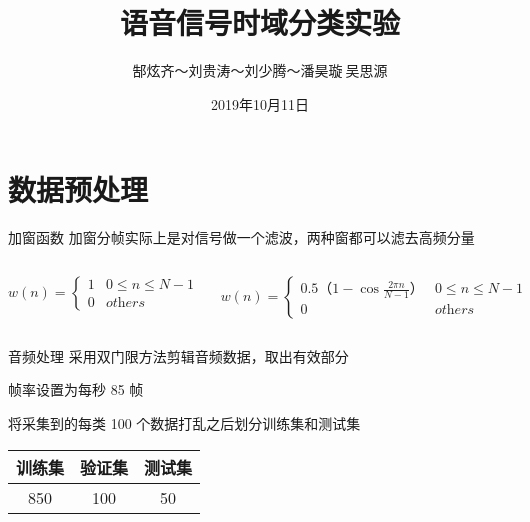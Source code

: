 \documentclass[aspectratio=169, 13pt,compress]{beamer}
\title{语音信号时域分类实验}
\author{郜炫齐$～$刘贵涛$～$刘少腾$～$潘昊璇$~$吴思源}
\date{2019年10月11日}
\begin{document}
\maketitle
\frame{
\centering
\tableofcontents[hideallsubsections]
}

\section{数据预处理}
\frame{\sectionpage}

\begin{frame}{加窗函数}
加窗分帧实际上是对信号做一个滤波，两种窗都可以滤去高频分量
\vspace{1cm}
 \begin{columns}
 
    $$ w(n) = \left \{ \begin{array}{cc}
        1 & 0 \leq n \leq N - 1 \\
        0 & \textit{others} 
    \end{array} \right.$$ 


$$ w(n) = \left \{ \begin{array}{cc}
     0.5（1- \cos{\frac{2 \pi n}{N -1 }}） & 0 \leq n \leq N -1  \\
     0 & \textit{others}
\end{array}
\right. $$
 \end{columns}
 
\end{frame}{}
\begin{frame}[center]{音频处理}
\centering
    采用双门限方法剪辑音频数据，取出有效部分\par
    帧率设置为每秒 85 帧 \par
    \vspace{1.0cm}
    将采集到的每类 100 个数据打乱之后划分训练集和测试集 \par
    \vspace{0.5cm}
    \begin{tabular}{c|c|c}
        训练集 & 验证集 & 测试集 \\ \hline
         850 & 100 & 50
    \end{tabular}
\end{frame}
\end{document}
